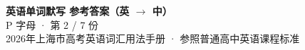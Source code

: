 \documentclass[10pt,a4paper]{article}
\begin{document}
\pagestyle{plain}

\begin{center}
{\LARGE\bfseries 英语单词默写 \quad 参考答案（英 $\to$ 中）}\\[0.22em]
{\large P 字母 · 第 2 / 7 份}\\[0.18em]
{\small 2026年上海市高考英语词汇用法手册 · 参照普通高中英语课程标准}
\end{center}

\vspace{0.2em}
\noindent{\color{rulegray}\rule{\textwidth}{0.8pt}}

\vspace{0.35em}

\vspace{0.25em}
\renewcommand{\arraystretch}{1.32}
\end{document}
